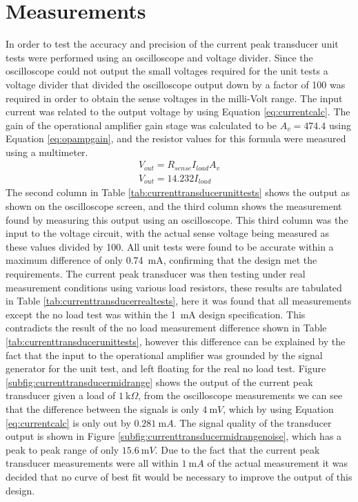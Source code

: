 \section{Measurements} \label{sec:measurements_current_peak_transducer}
In order to test the accuracy and precision of the current peak transducer unit tests were performed using an oscilloscope and voltage divider. Since the oscilloscope could not output the small voltages required for the unit tests a voltage divider that divided the oscilloscope output down by a factor of 100 was required in order to obtain the sense voltages in the milli-Volt range. The input current was related to the output voltage by using Equation \ref{eq:currentcalc}. The gain of the operational amplifier gain stage was calculated to be $A_{v}=474.4$ using Equation \ref{eq:opampgain}, and the resistor values for this formula were measured using a multimeter.
\begin{align}
   V_{out}=R_{sense}I_{load}A_{v} \\
   V_{out}= 14.232I_{load} \nonumber
   \label{eq:currentcalc}
\end{align}
The second column in Table \ref{tab:currenttransducerunittests} shows the output as shown on the oscilloscope screen, and the third column shows the measurement found by measuring this output using an oscilloscope. This third column was the input to the voltage circuit, with the actual sense voltage being measured as these values divided by 100. All unit tests were found to be accurate within a maximum difference of only \SI{0.74}{\milli A}, confirming that the design met the requirements. \vspace{4mm} \newline 
The current peak transducer was then testing under real measurement conditions using various load resistors, these results are tabulated in Table \ref{tab:currenttransducerrealtests}, here it was found that all measurements except the no load test was within the \SI{1}{\milli A} design specification. This contradicts the result of the no load measurement difference shown in Table \ref{tab:currenttransducerunittests}, however this difference can be explained by the fact that the input to the operational amplifier was grounded by the signal generator for the unit test, and left floating for the real no load test. \vspace{4mm} \newline  
Figure \ref{subfig:currenttransducermidrange} shows the output of the current peak transducer given a load of  $\SI{1}{\kilo \Omega}$, from the oscilloscope measurements we can see that the difference between the signals is only $\SI{4}{\milli V}$, which by using Equation \ref{eq:currentcalc} is only out by $\SI{0.281}{\milli A}$. The signal quality of the transducer output is shown in Figure \ref{subfig:currenttransducermidrangenoise}, which has a peak to peak range of only $\SI{15.6}{\milli V}$. Due to the fact that the current peak transducer measurements were all within $\SI{1}{\milli A}$ of the actual measurement it was decided that no curve of best fit would be necessary to improve the output of this design.

